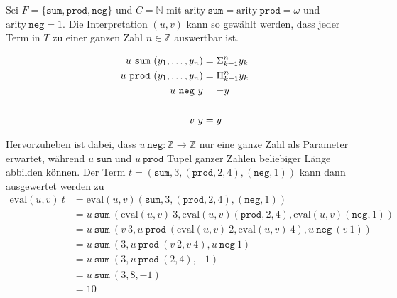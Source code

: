 \begin{beispiel} \label{bEval}
Sei $F = \{\texttt{sum}, \texttt{prod}, \texttt{neg} \}$ und $C = \mathbb{N}$ mit $\mathrm{arity}~ \texttt{sum} = \mathrm{arity}~ \texttt{prod} = \omega$ und $\mathrm{arity}~ \texttt{neg} = 1$.
Die Interpretation $(u, v)$ kann so gewählt werden, dass jeder Term in $T$ zu einer ganzen Zahl $n \in \mathbb{Z}$ auswertbar ist.

\begin{equation*}
    \begin{split}
    u~\texttt{sum}  ~({y}_{1}, \dots, {y}_{n}) &= \Sigma_{k = 1}^n y_k\\
    u~\texttt{prod} ~({y}_{1}, \dots, {y}_{n}) &=    \Pi_{k = 1}^n y_k\\
    u~\texttt{neg}~y &= -y\\
    &\\
    v~y &= y
    \end{split}
\end{equation*}

Hervorzuheben ist dabei, dass $u~\texttt{neg} \colon \mathbb Z \rightarrow \mathbb Z$ nur eine ganze Zahl als Parameter erwartet, während $u~\texttt{sum}$ und $u~\texttt{prod}$ Tupel ganzer Zahlen beliebiger Länge abbilden können.
Der Term $t = (\texttt{sum}, 3, (\texttt{prod}, 2, 4), (\texttt{neg}, 1))$ kann dann ausgewertet werden zu 
\begin{equation*}
    \begin{split}
    \mathrm{eval}(u, v)~t &= \mathrm{eval}(u, v) (\texttt{sum}, 3, (\texttt{prod}, 2, 4), (\texttt{neg}, 1)) \\
    &= u~\texttt{sum}~(\mathrm{eval}(u, v)~3, \mathrm{eval}(u, v)(\texttt{prod}, 2, 4),  \mathrm{eval}(u, v) (\texttt{neg}, 1)) \\
    &= u~\texttt{sum}~(v~3, u~\texttt{prod}~(\mathrm{eval}(u, v)~2, \mathrm{eval}(u, v)~4), u~\texttt{neg}~ (v~1)) \\
    &= u~\texttt{sum}~(3, u~\texttt{prod}~(v~2, v~4), u~\texttt{neg}~ 1) \\
    &= u~\texttt{sum}~(3, u~\texttt{prod}~(2, 4), -1) \\
    &= u~\texttt{sum}~( 3, 8, -1) \\
    &= 10 \\
    \end{split}
\end{equation*}
\end{beispiel}


